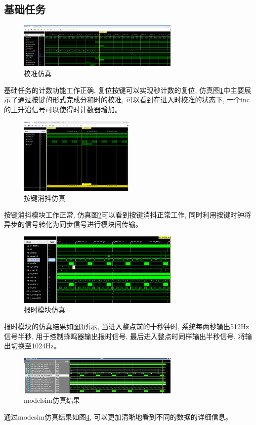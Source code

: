 \documentclass{article}
\begin{document}
\subsection*{基础任务}
\begin{figure}[htbp]
    \centering
    \includegraphics[width=0.7\textwidth]{image/2024-06-24-16-50-03.png}
    \caption{校准仿真}
    \label{image_base_sim_1}
\end{figure}
基础任务的计数功能工作正确, 复位按键可以实现秒计数的复位, 仿真图\ref{image_base_sim_1}中主要展示了通过按键的形式完成分和时的校准, 可以看到在进入时校准的状态下, 一个inc的上升沿信号可以使得时计数器增加。
\begin{figure}[htbp]
    \centering
    \includegraphics[width=0.5\textwidth]{image/2024-06-24-21-06-19.png}
    \caption{按键消抖仿真}
    \label{image_base_sim_2}
\end{figure}
按键消抖模块工作正常, 仿真图\ref{image_base_sim_2}可以看到按键消抖正常工作, 同时利用按键时钟将异步的信号转化为同步信号进行模块间传输。
\begin{figure}[htbp]
    \centering
    \includegraphics[width=0.7\textwidth]{image/2024-06-25-22-48-35.png}
    \caption{报时模块仿真}
    \label{image_tellTime_sim_1}
\end{figure}
报时模块的仿真结果如图\ref{image_tellTime_sim_1}所示, 当进入整点前的十秒钟时, 系统每两秒输出512Hz信号半秒, 用于控制蜂鸣器输出报时信号, 最后进入整点时同样输出半秒信号, 将输出切换至1024Hz。
\begin{figure}[htbp]
    \centering
    \includegraphics[width=0.7\textwidth]{image/2024-06-25-21-26-28.png}
    \caption{modelsim仿真结果}
    \label{image_tellTime_sim_2}
\end{figure}
通过modesim仿真结果如图\ref{image_tellTime_sim_2}, 可以更加清晰地看到不同的数据的详细信息。
\end{document}
